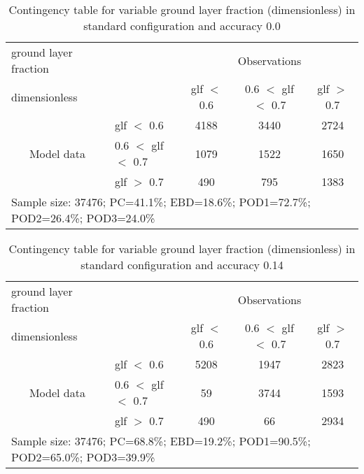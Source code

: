 \documentclass[11pt,english]{article}
\begin{document}
\newpage

\clearpage
\begin{table}[]
\begin{center}
\begin{tabular}{llccc}
\hline
{ground layer fraction}                                       &                                                    & \multicolumn{3}{c}{Observations}                 \\
{dimensionless}                                       &                             & glf $<$ 0.6   & 0.6 $<$ glf $<$ 0.7 & glf $>$ 0.7 \\
\hline
\multicolumn{1}{c}{\multirow{3}{*}{Model data}}  & glf $<$ 0.6             & 4188                & 3440                       & 2724              \\
                                                 & 0.6  $<$ glf $<$ 0.7 & 1079                & 1522                       & 1650              \\
                                                 & glf $>$ 0.7             & 490                & 795                       & 1383              \\
\hline
\multicolumn{5}{l}{Sample size: 37476; PC=41.1\%; EBD=18.6\%; POD1=72.7\%; POD2=26.4\%; POD3=24.0\%}
\end{tabular}
\end{center}
\caption{Contingency table for variable ground layer fraction (dimensionless) in standard configuration and accuracy 0.0}
\label{tab:contingencyglfBEF}
\end{table}
\begin{table}[]
\begin{center}
\begin{tabular}{llccc}
\hline
{ground layer fraction}                                       &                                                    & \multicolumn{3}{c}{Observations}                 \\
{dimensionless}                                       &                             & glf $<$ 0.6   & 0.6 $<$ glf $<$ 0.7 & glf $>$ 0.7 \\
\hline
\multicolumn{1}{c}{\multirow{3}{*}{Model data}}  & glf $<$ 0.6             & 5208                & 1947                       & 2823              \\
                                                 & 0.6  $<$ glf $<$ 0.7 & 59                & 3744                       & 1593              \\
                                                 & glf $>$ 0.7             & 490                & 66                       & 2934              \\
\hline
\multicolumn{5}{l}{Sample size: 37476; PC=68.8\%; EBD=19.2\%; POD1=90.5\%; POD2=65.0\%; POD3=39.9\%}
\end{tabular}
\end{center}
\caption{Contingency table for variable ground layer fraction (dimensionless) in standard configuration and accuracy 0.14}
\label{tab:contingencyglfBEF}
\end{table}
\end{document}
